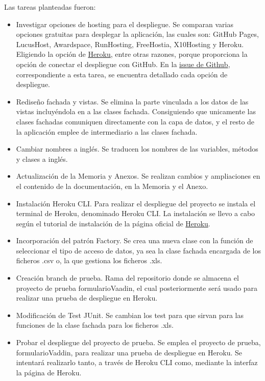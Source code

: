 Las tareas planteadas fueron:
\begin{itemize}
	\tightlist
	\item Investigar opciones de hosting para el despliegue. 
		Se comparan varias opciones gratuitas para desplegar la aplicación, las cuales son: GitHub Pages, LucusHost, Awardspace, RunHosting, FreeHostia, X10Hosting y Heroku. Eligiendo la opción de \href{https://dashboard.heroku.com/}{Heroku}, entre otras razones, porque proporciona la opción de conectar el despliegue con GitHub. En la \href{https://github.com/dbo1001/Gestor-TFG-2021/issues/26}{issue de Github}, correspondiente a esta tarea, se encuentra detallado cada opción de despliegue.
	\item Rediseño fachada y vistas. 
		Se elimina la parte vinculada a los datos de las vistas incluyéndola en a las clases fachada. Consiguiendo que unicamente las clases fachadas comuniquen directamente con la capa de datos, y el resto de la aplicación emplee de intermediario a las clases fachada.
	\item Cambiar nombres a inglés.
		Se traducen los nombres de las variables, métodos y clases a inglés.
	\item Actualización de la Memoria y Anexos.
		Se realizan cambios y ampliaciones en el contenido de la documentación, en la Memoria y el Anexo.
	\item Instalación Heroku CLI. 
		Para realizar el despliegue del proyecto se instala el terminal de Heroku, denominado Heroku CLI. La instalación se llevo a cabo según el tutorial de instalación de la página oficial de \href{https://devcenter.heroku.com/articles/heroku-cli}{Heroku}.
	\item Incorporación del patrón Factory. 
		Se crea una nueva clase con la función de seleccionar el tipo de acceso de datos, ya sea la clase fachada encargada de los ficheros .csv o, la que gestiona los ficheros .xls.
	\item Creación branch de prueba. 
		Rama del repositorio donde se almacena el proyecto de prueba formularioVaadin, el cual posteriormente será usado para realizar una prueba de despliegue en Heroku.
	\item Modificación de Test JUnit. 
		Se cambian los test para que sirvan para las funciones de la clase fachada para los ficheros .xls. 
	\item Probar el despliegue del proyecto de prueba. 
		Se emplea el proyecto de prueba, formularioVaddin, para realizar una prueba de despliegue en Heroku. Se intentará realizarlo tanto, a través de Heroku CLI como, mediante la interfaz la página de Heroku.
	
\end{itemize}


